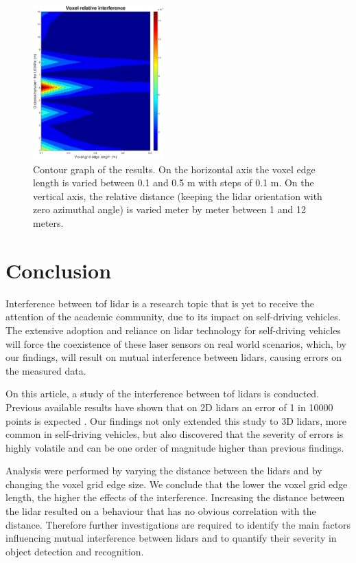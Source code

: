 \documentclass[extendedabs]{recpad2k}
\begin{document}
\begin{figure}
    \centering
    \includegraphics[width=0.45\textwidth]{images/contour.eps}
    \caption{Contour graph of the results. On the horizontal axis the voxel edge length is varied between 0.1 and 0.5 m with steps of 0.1 m. On the vertical axis, the relative distance (keeping the \gls{lidar} orientation with zero azimuthal angle) is varied meter by meter between 1 and 12 meters.}
    \label{fig:results}
\end{figure}

\section{Conclusion}
Interference between \gls{tof} \gls{lidar} is a research topic that is yet to receive the attention of the academic community, due to its impact on self-driving vehicles. The extensive adoption and reliance on \gls{lidar} technology for self-driving vehicles will force the coexistence of these laser sensors on real world scenarios, which, by our findings, will result on mutual interference between \gls{lidar}s, causing errors on the measured data.

On this article, a study of the interference between \gls{tof} \gls{lidar}s is conducted. Previous available results have shown that on 2D \gls{lidar}s an error of 1 in 10000 points is expected \cite{Kim2017, Kim2015}. Our findings not only extended this study to 3D \gls{lidar}s, more common in self-driving vehicles, but also discovered that the severity of errors is highly volatile and can be one order of magnitude higher than previous findings.

Analysis were performed by varying the distance between the \gls{lidar}s and by changing the voxel grid edge size. We conclude that the lower the voxel grid edge length, the higher the effects of the interference. Increasing the distance between the \gls{lidar} resulted on a behaviour that has no obvious correlation with the distance. Therefore further investigations are required to identify the main factors influencing mutual interference between \gls{lidar}s and to quantify their severity in object detection and recognition.


\footnotesize

\end{document}
